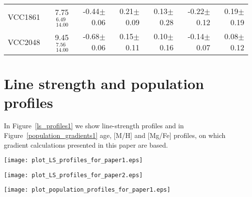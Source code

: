 \documentclass[useAMS,usenatbib]{mn2e}
\newcounter{subfigure}
\newcommand{\hbo}{H$\beta_o$}
\begin{document}
\begin{table*}
\begin{threeparttable}
\begin{tabular}{|r|r|r|r|r|r|r|}
\rule{0pt}{3ex}
VCC1861 &        7.75$^{       6.49}_{       14.00}$ &     -0.44$\pm$     0.06 &       0.21$\pm$     0.09 &      0.13$\pm$      0.28&     -0.22$\pm$      0.12&      0.19$\pm$      0.19\\
\rule{0pt}{3ex}
VCC2048 &        9.45$^{       7.56}_{       14.00}$ &     -0.68$\pm$     0.06 &       0.15$\pm$      0.11 &      0.10$\pm$      0.16&     -0.14$\pm$     0.07&     0.08$\pm$      0.12\\
\hline
\end{tabular}
\label{resultstable-ssp}
\end{threeparttable}
\end{table*}

\section{Line strength and population profiles}
\label{app-pop_profiles}

In Figure~\ref{ls_profiles1} we show line-strength profiles and in  Figure~\ref{population_gradients1} age, [M/H] and [Mg/Fe] profiles, on which gradient calculations presented in this paper are based.

\begin{figure*}
\begin{fullpage}
\centering
\texttt{[image: plot\_LS\_profiles\_for\_paper1.eps]}
\caption{{\hbo}, Fe5015 and Mg$b$ profiles.}
\label{ls_profiles1}  
\end{fullpage}
\end{figure*}

\addtocounter{figure}{-1}
\addtocounter{subfigure}{1}

\begin{figure*}
\begin{fullpage}
\centering
\texttt{[image: plot\_LS\_profiles\_for\_paper2.eps]}
\caption{Continued.}
\label{ls_profiles2}  
\end{fullpage}
\end{figure*}


\begin{figure*}
\begin{fullpage}
\centering
\texttt{[image: plot\_population\_profiles\_for\_paper1.eps]}
\caption{Age, [M/H] and [Mg/Fe] profiles.}
\label{population_gradients1}  
\end{fullpage}
\end{figure*}

\addtocounter{figure}{-1}
\addtocounter{subfigure}{1}
\end{document}

